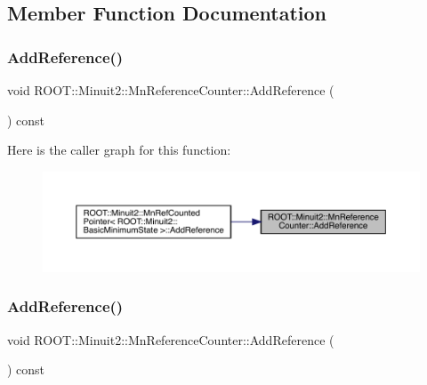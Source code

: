 \subsection{Member Function Documentation}
\mbox{\label{classROOT_1_1Minuit2_1_1MnReferenceCounter_afab040d933d93fd7f86b3c14a8d1910d}} 
\subsubsection{\texorpdfstring{AddReference()}{AddReference()}\hspace{0.1cm}{\footnotesize\ttfamily [1/3]}}
{\footnotesize\ttfamily void R\+O\+O\+T\+::\+Minuit2\+::\+Mn\+Reference\+Counter\+::\+Add\+Reference (\begin{DoxyParamCaption}{ }\end{DoxyParamCaption}) const\hspace{0.3cm}{\ttfamily [inline]}}

Here is the caller graph for this function\+:
\nopagebreak
\begin{figure}[H]
\begin{center}
\leavevmode
\includegraphics[width=350pt]{dc/da2/classROOT_1_1Minuit2_1_1MnReferenceCounter_afab040d933d93fd7f86b3c14a8d1910d_icgraph}
\end{center}
\end{figure}
\mbox{\label{classROOT_1_1Minuit2_1_1MnReferenceCounter_afab040d933d93fd7f86b3c14a8d1910d}} 
\subsubsection{\texorpdfstring{AddReference()}{AddReference()}\hspace{0.1cm}{\footnotesize\ttfamily [2/3]}}
{\footnotesize\ttfamily void R\+O\+O\+T\+::\+Minuit2\+::\+Mn\+Reference\+Counter\+::\+Add\+Reference (\begin{DoxyParamCaption}{ }\end{DoxyParamCaption}) const\hspace{0.3cm}{\ttfamily [inline]}}

